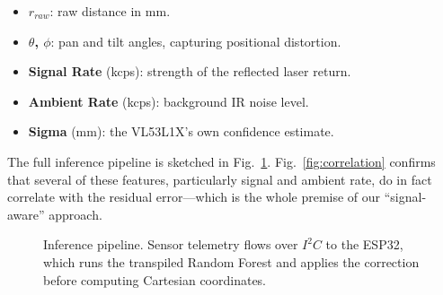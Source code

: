 \documentclass[conference, a4paper]{IEEEtran}
\begin{document}
\begin{itemize}
    \item \textbf{$r_{raw}$}: raw distance in mm.
    \item \textbf{$\theta$, $\phi$}: pan and tilt angles, capturing positional distortion.
    \item \textbf{Signal Rate} (kcps): strength of the reflected laser return.
    \item \textbf{Ambient Rate} (kcps): background IR noise level.
    \item \textbf{Sigma} (mm): the VL53L1X's own confidence estimate.
\end{itemize}

The full inference pipeline is sketched in Fig.~\ref{fig:architecture}. Fig.~\ref{fig:correlation} confirms that several of these features, particularly signal and ambient rate, do in fact correlate with the residual error---which is the whole premise of our ``signal-aware'' approach.

\begin{figure}[htbp]
\centering
{}
\caption{Inference pipeline. Sensor telemetry flows over $I^2C$ to the ESP32, which runs the transpiled Random Forest and applies the correction before computing Cartesian coordinates.}
\label{fig:architecture}
\end{figure}
\end{document}

